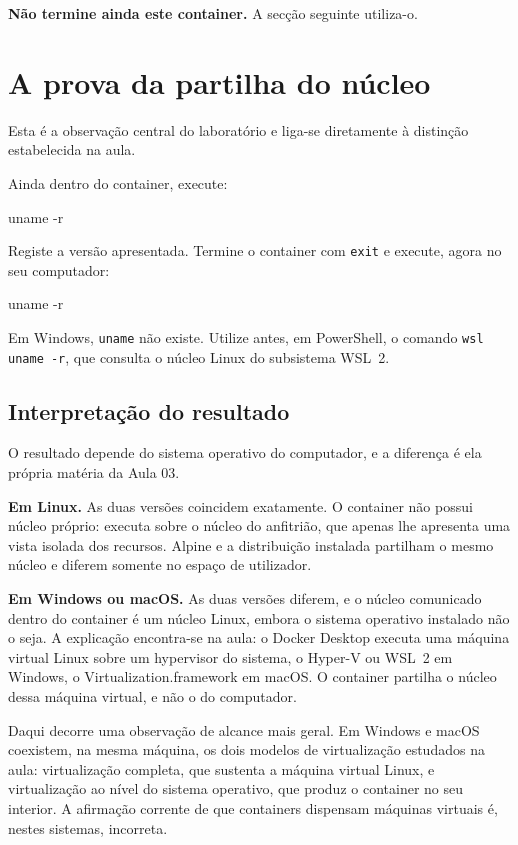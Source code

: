 \documentclass[11pt,a4paper]{article}
\begin{document}
\textbf{Não termine ainda este container.} A secção seguinte utiliza-o.

\section{A prova da partilha do núcleo}

Esta é a observação central do laboratório e liga-se diretamente à distinção estabelecida na aula.

Ainda dentro do container, execute:

\begin{terminal}
uname -r
\end{terminal}

Registe a versão apresentada. Termine o container com \texttt{exit} e execute, agora no seu computador:

\begin{terminal}
uname -r
\end{terminal}

\begin{atencao}
Em Windows, \texttt{uname} não existe. Utilize antes, em PowerShell, o comando \texttt{wsl uname -r}, que consulta o núcleo Linux do subsistema WSL~2.
\end{atencao}

\subsection{Interpretação do resultado}

O resultado depende do sistema operativo do computador, e a diferença é ela própria matéria da Aula 03.

\textbf{Em Linux.} As duas versões coincidem exatamente. O container não possui núcleo próprio: executa sobre o núcleo do anfitrião, que apenas lhe apresenta uma vista isolada dos recursos. Alpine e a distribuição instalada partilham o mesmo núcleo e diferem somente no espaço de utilizador.

\textbf{Em Windows ou macOS.} As duas versões diferem, e o núcleo comunicado dentro do container é um núcleo Linux, embora o sistema operativo instalado não o seja. A explicação encontra-se na aula: o Docker Desktop executa uma máquina virtual Linux sobre um hypervisor do sistema, o Hyper-V ou WSL~2 em Windows, o Virtualization.framework em macOS. O container partilha o núcleo dessa máquina virtual, e não o do computador.

\begin{nota}
Daqui decorre uma observação de alcance mais geral. Em Windows e macOS coexistem, na mesma máquina, os dois modelos de virtualização estudados na aula: virtualização completa, que sustenta a máquina virtual Linux, e virtualização ao nível do sistema operativo, que produz o container no seu interior. A afirmação corrente de que containers dispensam máquinas virtuais é, nestes sistemas, incorreta.
\end{nota}
\end{document}
